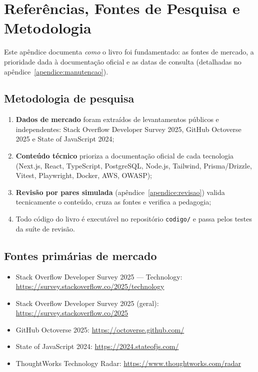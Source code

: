 \chapter{Referências, Fontes de Pesquisa e Metodologia}
\label{apendice:referencias}

Este apêndice documenta \emph{como} o livro foi fundamentado: as fontes de
mercado, a prioridade dada à documentação oficial e as datas de consulta
(detalhadas no apêndice~\ref{apendice:manutencao}).

\section{Metodologia de pesquisa}

\begin{enumerate}[leftmargin=*, itemsep=0.4em]
  \item \textbf{Dados de mercado} foram extraídos de levantamentos públicos e
  independentes: Stack Overflow Developer Survey 2025, GitHub Octoverse 2025 e
  State of JavaScript 2024;
  \item \textbf{Conteúdo técnico} prioriza a documentação oficial de cada
  tecnologia (Next.js, React, TypeScript, PostgreSQL, Node.js, Tailwind,
  Prisma/Drizzle, Vitest, Playwright, Docker, AWS, OWASP);
  \item \textbf{Revisão por pares simulada} (apêndice~\ref{apendice:revisao})
  valida tecnicamente o conteúdo, cruza as fontes e verifica a pedagogia;
  \item Todo código do livro é executável no repositório \texttt{codigo/} e
  passa pelos testes da suíte de revisão.
\end{enumerate}

\section{Fontes primárias de mercado}

\begin{itemize}[leftmargin=*, itemsep=0.4em]
  \item Stack Overflow Developer Survey 2025 --- Technology: \url{https://survey.stackoverflow.co/2025/technology}
  \item Stack Overflow Developer Survey 2025 (geral): \url{https://survey.stackoverflow.co/2025}
  \item GitHub Octoverse 2025: \url{https://octoverse.github.com/}
  \item State of JavaScript 2024: \url{https://2024.stateofjs.com/}
  \item ThoughtWorks Technology Radar: \url{https://www.thoughtworks.com/radar}
\end{itemize}

